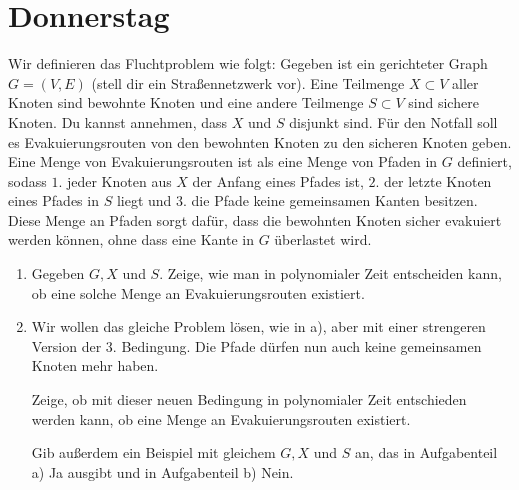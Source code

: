 \documentclass{uebung_cs}
\begin{document}
\section*{Donnerstag}

\begin{aufgabe}[Fluchtwege]
    Wir definieren das Fluchtproblem wie folgt: Gegeben ist ein gerichteter Graph $G = (V,E)$ (stell dir ein Straßennetzwerk vor). Eine Teilmenge $X \subset V$ aller Knoten sind bewohnte Knoten und eine andere Teilmenge $S \subset V$ sind sichere Knoten. Du kannst annehmen, dass $X$ und $S$ disjunkt sind. Für den Notfall soll es Evakuierungsrouten von den bewohnten Knoten zu den sicheren Knoten geben. Eine Menge von Evakuierungsrouten ist als eine Menge von Pfaden in $G$ definiert, sodass $1.$ jeder Knoten aus $X$ der Anfang eines Pfades ist, $2.$ der letzte Knoten eines Pfades in $S$ liegt und $3.$ die Pfade keine gemeinsamen Kanten besitzen. Diese Menge an Pfaden sorgt dafür, dass die bewohnten Knoten sicher evakuiert werden können, ohne dass eine Kante in $G$ überlastet wird.
    \begin{enumerate}
    	\item Gegeben $G, X$ und $S$. Zeige, wie man in polynomialer Zeit entscheiden kann, ob eine solche Menge an Evakuierungsrouten existiert.\\
    	\item Wir wollen das gleiche Problem lösen, wie in a), aber mit einer strengeren Version der $3.$ Bedingung. Die Pfade dürfen nun auch keine gemeinsamen Knoten mehr haben.
    	
    	Zeige, ob mit dieser neuen Bedingung in polynomialer Zeit entschieden werden kann, ob eine Menge an Evakuierungsrouten existiert.
    	
    	Gib außerdem ein Beispiel mit gleichem $G, X$ und $S$ an, das in Aufgabenteil a) \glqq Ja\grqq{} ausgibt und in Aufgabenteil b) \glqq Nein\grqq.
    \end{enumerate}
\end{aufgabe}
\end{document}
